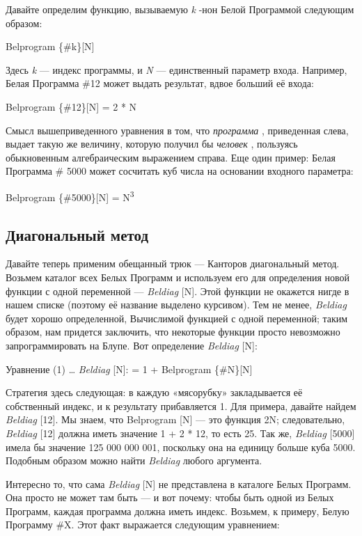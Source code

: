 \documentclass[../main.tex]{subfiles}
\begin{document}
Давайте определим функцию, вызываемую \emph{k} -нон Белой Программой следующим образом:

Belprogram \{\#k\}{[}N{]}

Здесь \emph{k} --- индекс программы, и \emph{N} --- единственный параметр входа. Например, Белая Программа \#12 может выдать результат, вдвое больший её входа:

Belprogram \{\#12\}{[}N{]} = 2 * N

Смысл вышеприведенного уравнения в том, что \emph{программа} , приведенная слева, выдает такую же величину, которую получил бы \emph{человек} , пользуясь обыкновенным алгебраическим выражением справа. Еще один пример: Белая Программа \# 5000 может сосчитать куб числа на основании входного параметра:

Belprogram \{\#5000\}{[}N{]} = N\textsuperscript{3}


\subsection{Диагональный метод}

Давайте теперь применим обещанный трюк --- Канторов диагональный метод. Возьмем каталог всех Белых Программ и используем его для определения новой функции с одной переменной --- \emph{Beldiag} {[}N{]}. Этой функции не окажется нигде в нашем списке (поэтому её название выделено курсивом). Тем не менее, \emph{Beldiag} будет хорошо определенной, Вычислимой функцией с одной переменной; таким образом, нам придется заключить, что некоторые функции просто невозможно запрограммировать на Блупе. Вот определение \emph{Beldiag} {[}N{]}:

Уравнение (1) \ldots{} \emph{Beldiag} {[}N{]}: = 1 + Belprogram \{\#N\}{[}N{]}

Стратегия здесь следующая: в каждую «мясорубку» закладывается её собственный индекс, и к результату прибавляется 1. Для примера, давайте найдем \emph{Beldiag} {[}12{]}. Мы знаем, что Belprogram {[}N{]} --- это функция 2N; следовательно, \emph{Beldiag} {[}12{]} должна иметь значение 1 + 2 * 12, то есть 25. Так же, \emph{Beldiag} {[}5000{]} имела бы значение 125 000 000 001, поскольку она на единицу больше куба 5000. Подобным образом можно найти \emph{Beldiag} любого аргумента.

Интересно то, что сама \emph{Beldiag} {[}N{]} не представлена в каталоге Белых Программ. Она просто не может там быть --- и вот почему: чтобы быть одной из Белых Программ, каждая программа должна иметь индекс. Возьмем, к примеру, Белую Программу \#X\@. Этот факт выражается следующим уравнением:
\end{document}
